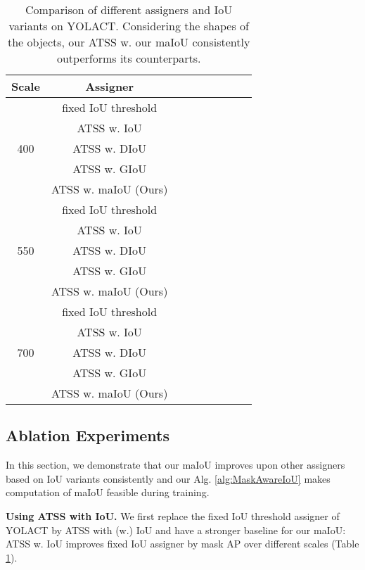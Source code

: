 \documentclass{bmvc2k}
\begin{document}
\begin{table}
    \centering
    \small
    \setlength{\tabcolsep}{0.35em}
    \caption{Comparison of different assigners and IoU variants on YOLACT. Considering the shapes of the objects, our ATSS w. our maIoU consistently outperforms its  counterparts.}
    \label{tab:minival}
    \begin{tabular}{|c|c|c|c|c|c|c|c|c|} \hline
        Scale & Assigner &  &  &  &  &  &  &  \\ \hline
    \multirow{5}{*}{400}&fixed IoU threshold&&&&&&& \\
    &ATSS w. IoU&&&&&&& \\
    &ATSS w. DIoU&&&&&&& \\
    &ATSS w. GIoU&&&&&&& \\ \cline{2-9}
&ATSS w. maIoU (Ours)&&&&&&&\\ \hline \hline 
    \multirow{5}{*}{550} &fixed IoU threshold&  &  &  &  &  &  &  \\
    & ATSS w. IoU&&  &  &  &  &  &  \\
    &ATSS w. DIoU&&&&&&& \\
    &ATSS w. GIoU&&&&&&& \\ \cline{2-9}
& ATSS w. maIoU (Ours)& &  &  &  &  &  &  \\ \hline \hline 
    \multirow{5}{*}{700} &fixed IoU threshold&&&&&&&\\
    & ATSS w. IoU&&&&&&&\\
    &ATSS w. DIoU&&&&&&& \\
    &ATSS w. GIoU&&&&&&& \\ \cline{2-9}
    & ATSS w. maIoU (Ours)&&&&&&&\\ \hline 
    \end{tabular}
\end{table}
\label{subsec:Ablation}


\subsection{Ablation Experiments}
In this section, we demonstrate that our maIoU improves upon other assigners based on IoU variants consistently and our Alg. \ref{alg:MaskAwareIoU} makes computation of maIoU feasible during training.

\noindent \textbf{Using ATSS with IoU.} We first replace the fixed IoU threshold assigner of YOLACT by ATSS with (w.) IoU and have a stronger baseline for our maIoU: ATSS w. IoU improves fixed IoU assigner by  mask AP over different scales (Table \ref{tab:minival}).
\end{document}
